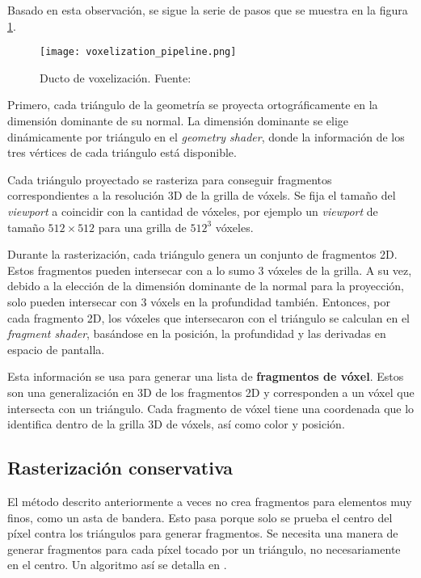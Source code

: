 Basado en esta observación, se sigue la serie de pasos que se muestra en la figura \ref{fig:voxelization_pipeline}.

\begin{figure}[h!]
    \centering
    \texttt{[image: voxelization\_pipeline.png]}
    \caption{Ducto de voxelización. Fuente: \cite{opengl-insights}}
    \label{fig:voxelization_pipeline}
\end{figure}

Primero, cada triángulo de la geometría se proyecta ortográficamente en la dimensión dominante de su normal.
La dimensión dominante se elige dinámicamente por triángulo en el \textit{geometry shader}, donde la información de los tres vértices de cada triángulo está disponible.

Cada triángulo proyectado se rasteriza para conseguir fragmentos correspondientes a la resolución 3D de la grilla de vóxels.
Se fija el tamaño del \textit{viewport} a coincidir con la cantidad de vóxeles, por ejemplo un \textit{viewport} de tamaño $512\times512$ para una grilla de $512^3$ vóxeles.

Durante la rasterización, cada triángulo genera un conjunto de fragmentos 2D.
Estos fragmentos pueden intersecar con a lo sumo 3 vóxeles de la grilla. %
A su vez, debido a la elección de la dimensión dominante de la normal para la proyección, solo pueden intersecar con 3 vóxels en la profundidad también. %
Entonces, por cada fragmento 2D, los vóxeles que intersecaron con el triángulo se calculan en el \textit{fragment shader}, basándose en la posición, la profundidad y las derivadas en espacio de pantalla. %

Esta información se usa para generar una lista de \textbf{fragmentos de vóxel}.
Estos son una generalización en 3D de los fragmentos 2D y corresponden a un vóxel que intersecta con un triángulo.
Cada fragmento de vóxel tiene una coordenada que lo identifica dentro de la grilla 3D de vóxels, así como color y posición.

\subsection{Rasterización conservativa}

El método descrito anteriormente a veces no crea fragmentos para elementos muy finos, como un asta de bandera.
Esto pasa porque solo se prueba el centro del píxel contra los triángulos para generar fragmentos. %
Se necesita una manera de generar fragmentos para cada píxel tocado por un triángulo, no necesariamente en el centro.
Un algoritmo así se detalla en \cite{conservative-rasterization}.

